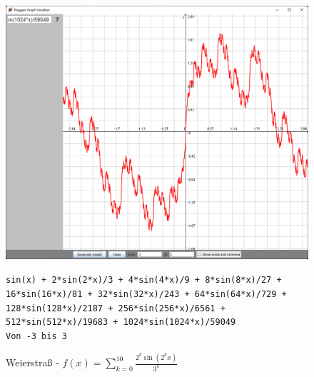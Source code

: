 \documentclass[12pt]{article}
\begin{document}
	\begin{figure}[!ht]
		\begin{center}
			\includegraphics[scale=0.5]{images/sample5.png}
		\end{center}
		\caption{Weierstraß - $f(x) = \sum_{k=0}^{10} \frac{2^k \sin(2^k x)}{3^k}$}

		\begin{center}
			\texttt{sin(x) + 2*sin(2*x)/3 + 4*sin(4*x)/9 + 8*sin(8*x)/27 + 16*sin(16*x)/81 + 32*sin(32*x)/243 + 64*sin(64*x)/729 + 128*sin(128*x)/2187 + 256*sin(256*x)/6561 + 512*sin(512*x)/19683 + 1024*sin(1024*x)/59049} \\
			\texttt{Von -3 bis 3}
		\end{center}
	\end{figure}
\end{document}
